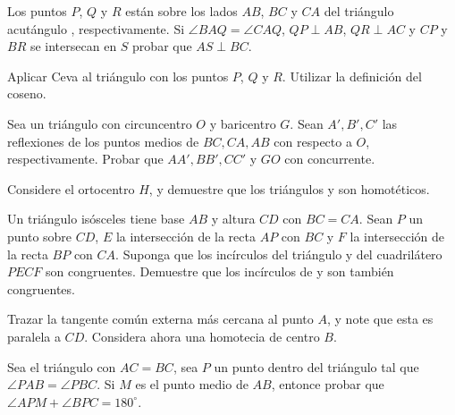 \begin{section-problem}
    Los puntos $P$, $Q$ y $R$ están sobre los lados $AB$, $BC$ y $CA$ del triángulo acutángulo , respectivamente.
    Si $\angle BAQ = \angle CAQ$, $QP \perp AB$, $QR \perp AC$ y $CP$ y $BR$ se intersecan en $S$ probar que $AS \perp BC$.
\end{section-problem}

\begin{hint}
    Aplicar Ceva al triángulo  con los puntos $P$, $Q$ y $R$.
    Utilizar la definición del coseno.
\end{hint}



\begin{section-problem}
    Sea  un triángulo con circuncentro $O$ y baricentro $G$.
    Sean $A', B', C'$ las reflexiones de los puntos medios de $BC, CA, AB$ con respecto a $O$, respectivamente.
    Probar que $AA', BB', CC'$ y $GO$ con concurrente.
\end{section-problem}

\begin{hint}
    Considere el ortocentro $H$, y demuestre que los triángulos  y  son homotéticos.
\end{hint}


\begin{section-problem}
    Un triángulo isósceles  tiene base $AB$ y altura $CD$ con $BC = CA$.
    Sean $P$ un punto sobre $CD$, $E$ la intersección de la recta $AP$ con $BC$ y $F$ la intersección de la recta $BP$ con $CA$.
    Suponga que los incírculos del triángulo  y del cuadrilátero $PECF$ son congruentes.
    Demuestre que los incírculos de  y  son también congruentes.
\end{section-problem}

\begin{hint}
    Trazar la tangente común externa más cercana al punto $A$, y note que esta es paralela a $CD$.
    Considera ahora una homotecia de centro $B$.
\end{hint}


\begin{section-problem}
    Sea el triángulo  con $AC = BC$, sea $P$ un punto dentro del triángulo tal que $\angle PAB = \angle PBC$.
    Si $M$ es el punto medio de $AB$, entonce probar que $\angle APM + \angle BPC = 180^{\circ}$.
\end{section-problem}

